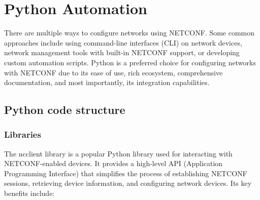 \section{Python Automation}

There are multiple ways to configure networks using NETCONF. Some common approaches include using command-line interfaces (CLI) on network devices, network management tools with built-in NETCONF support, or developing custom automation scripts. Python is a preferred choice for configuring networks with NETCONF due to its ease of use, rich ecosystem, comprehensive documentation, and most importantly, its integration capabilities.

\subsection{Python code structure}

\subsubsection{Libraries}

The ncclient library is a popular Python library used for interacting with NETCONF-enabled devices. It provides a high-level API (Application Programming Interface) that simplifies the process of establishing NETCONF sessions, retrieving device information, and configuring network devices. Its key benefits include:

